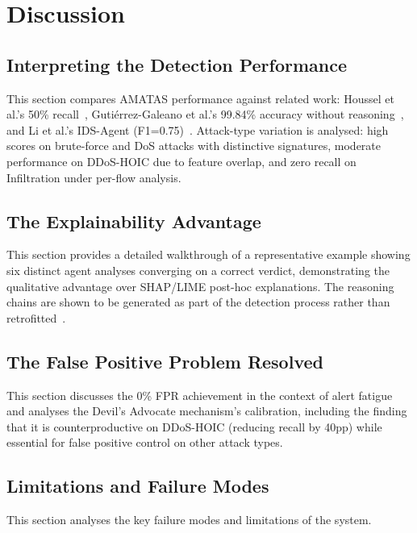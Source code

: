 \documentclass[12pt,openany,oneside,a4paper]{book}
\begin{document}
\chapter{Discussion}
\label{ch:discussion}

\section{Interpreting the Detection Performance}
\label{sec:interpreting-performance}
This section compares AMATAS performance against related work: Houssel et al.'s 50\% recall~\autocite{Houssel2024}, Guti\'{e}rrez-Galeano et al.'s 99.84\% accuracy without reasoning~\autocite{GutierrezGaleano2025}, and Li et al.'s IDS-Agent (F1=0.75)~\autocite{Li2024}. Attack-type variation is analysed: high scores on brute-force and DoS attacks with distinctive signatures, moderate performance on DDoS-HOIC due to feature overlap, and zero recall on Infiltration under per-flow analysis.

\section{The Explainability Advantage}
\label{sec:explainability-advantage}
This section provides a detailed walkthrough of a representative example showing six distinct agent analyses converging on a correct verdict, demonstrating the qualitative advantage over SHAP/LIME post-hoc explanations. The reasoning chains are shown to be generated as part of the detection process rather than retrofitted~\autocite{Wei2022}.

\section{The False Positive Problem Resolved}
\label{sec:fpr-resolved}
This section discusses the 0\% FPR achievement in the context of alert fatigue~\autocite{Alahmadi2020} and analyses the Devil's Advocate mechanism's calibration, including the finding that it is counterproductive on DDoS-HOIC (reducing recall by 40pp) while essential for false positive control on other attack types.

\section{Limitations and Failure Modes}
\label{sec:limitations}
This section analyses the key failure modes and limitations of the system.
\end{document}

